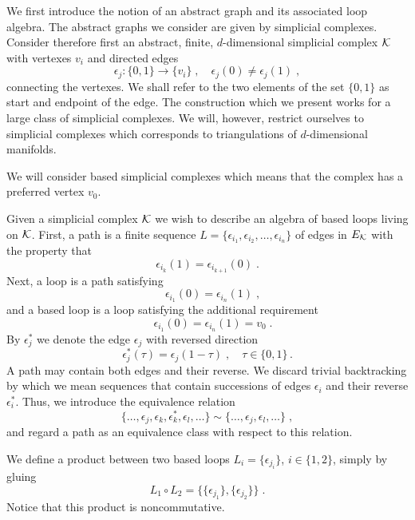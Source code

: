 \documentclass[12pt]{article}
\def\e{\epsilon}
\def\t{\tau}
\def\ck{{\cal K}}
\def\cm{{\cal M}}
\def\ct{{\cal T}}
\begin{document}
We first introduce the notion of an abstract graph and its associated loop algebra. 
The abstract graphs we consider are given by simplicial complexes.
Consider therefore first an abstract, finite, $d$-dimensional simplicial complex $\ck$ with vertexes $ v_i$ and directed edges
\[
\e_j:\{0,1\}\rightarrow \{ v_i \}\;,\quad \e_j(0)\not=\e_j(1)\;,
\]
connecting the vertexes. We shall refer to the two elements of the set $\{0,1\}$ as start and endpoint of the edge. 
The construction which we present works for a large class of simplicial complexes. We will, however, restrict ourselves to simplicial complexes which corresponds to triangulations of $d$-dimensional manifolds.




We will consider based simplicial complexes which means that the complex has a preferred vertex $v_0$.

Given a simplicial complex $\ck$ we wish to describe an algebra of based loops living on $\ck$. First, a path is a finite sequence $L=\{\e_{i_1},\e_{i_2},\ldots,\e_{i_n}\}$ of edges in $E_\ck$ with the property that 
\[
\e_{i_k}(1)=\e_{i_{k+1}}(0)\;.
\]
Next, a loop is a path satisfying
\[
\quad\e_{i_1}(0)=\e_{i_n}(1) \;,
\]
and a based loop is a loop satisfying the additional requirement
\[
\quad\e_{i_1}(0)=\e_{i_n}(1)=v_0 \;.
\]
By $\e_j^*$ we denote the edge $\e_j$ with reversed direction
\[
\e_j^*(\t) = \e_j(1-\t)\;,\quad \t\in\{0,1\}\,.
\]
A path may contain both edges and their reverse. We discard trivial backtracking by which we mean sequences that contain successions of edges $\e_i$ and their reverse $\e_i^*$. Thus, we introduce the equivalence relation
\[
\{\ldots,\e_j,\e_k,\e_k^*,\e_l,\ldots\}\sim \{\ldots,\e_j,\e_l,\ldots\}\;,
\] 
and regard a path as an equivalence class with respect to this relation.

We define a product between two based loops $L_i=\{\e_{j_i}\}$, $i\in\{1,2\}$, simply by gluing
\[
L_1\circ L_2 = \{\{\e_{j_1}\},\{\e_{j_2}\}\}\;.
\]
Notice that this product is noncommutative. 
\end{document}
